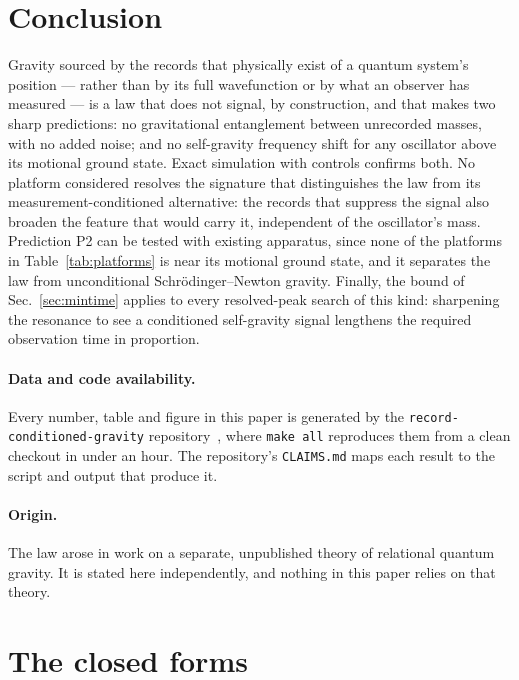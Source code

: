 \documentclass[aps,pra,reprint,amsmath,amssymb,superscriptaddress]{revtex4-2}
\begin{document}
\section{Conclusion}

Gravity sourced by the records that physically exist of a quantum system's
position --- rather than by its full wavefunction or by what an observer has
measured --- is a law that does not signal, by construction, and that makes
two sharp predictions: no gravitational entanglement between unrecorded
masses, with no added noise; and no self-gravity frequency shift for any
oscillator above its motional ground state. Exact simulation with controls
confirms both. No platform considered resolves the signature that
distinguishes the law from its measurement-conditioned alternative: the
records that suppress the signal also broaden the feature that would carry
it, independent of the oscillator's mass. Prediction P2 can
be tested with existing apparatus, since none of the platforms in
Table~\ref{tab:platforms} is near its motional ground state, and it separates
the law from unconditional Schr\"odinger--Newton gravity. Finally, the bound of
Sec.~\ref{sec:mintime} applies to every resolved-peak search of this kind:
sharpening the resonance to see a conditioned self-gravity signal lengthens
the required observation time in proportion.

\paragraph{Data and code availability.} Every number, table and figure in
this paper is generated by the \texttt{record-conditioned-gravity}
repository~\cite{rcgrepo}, where \texttt{make all} reproduces them from a
clean checkout in under an hour. The repository's \texttt{CLAIMS.md} maps each
result to the script and output that produce it.

\paragraph{Origin.} The law arose in work on a separate, unpublished theory
of relational quantum gravity. It is stated here independently, and nothing in
this paper relies on that theory.

\appendix

\section{The closed forms}
\label{app:closedforms}
\end{document}
